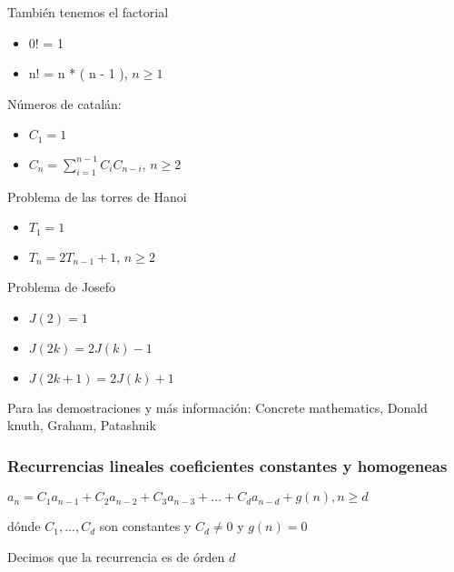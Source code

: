 También tenemos el factorial
\begin{itemize}
    \item {0! = 1}
    \item {n! = n * ( n - 1 ), $ n \geq 1 $}
\end{itemize}

Números de catalán:
\begin{itemize}
    \item { $C_{1} = 1$ }
    \item { $C_{n} = \sum_{i = 1}^{n - 1} C_{i}C_{n - i}$, $n \geq 2$}
\end{itemize}

Problema de las torres de Hanoi
\begin{itemize}
    \item {$T_{1} = 1$}
    \item {$T_{n} = 2T_{n - 1} + 1$, $ n \geq 2$}
\end{itemize}

Problema de Josefo
\begin{itemize}
    \item {$J(2) = 1$}
    \item {$J(2k) = 2J(k) - 1$}
    \item {$J(2k + 1) = 2J(k) + 1$}
\end{itemize}

Para las demostraciones y más información: \textsf{Concrete mathematics, Donald knuth, Graham, Patashnik} \break

\subsubsection{Recurrencias lineales coeficientes constantes y homogeneas}
$a_{n} = C_{1}a_{n-1} + C_{2}a_{n-2} + C_{3}a_{n-3} + \dots + C_{d}a_{n-d} + g(n), n \geq d$

dónde $C_{1}, \dots , C_{d}$ son constantes y $C_{d} \neq 0$ y $g(n) = 0$ \newline

Decimos que la recurrencia es de órden $d$

